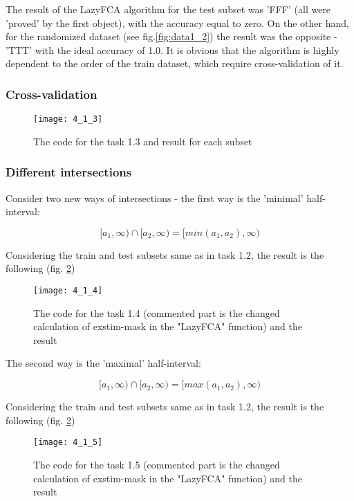 The result of the LazyFCA algorithm for the test subset was 'FFF' (all were 'proved' by the first object), with the accuracy equal to zero. 
On the other hand, for the randomized dataset (see fig.\ref{fig:data1_2}) the result was the opposite - 'TTT' with the ideal accuracy of 1.0.
It is obvious that the algorithm is highly dependent to the order of the train dataset, which require cross-validation of it.


\subsubsection{Cross-validation}

\begin{figure}[h]
\centering
\texttt{[image: 4\_1\_3]}
\caption{The code for the task 1.3 and result for each subset}
\end{figure}

\subsubsection{Different intersections}

Consider two new ways of intersections - the first way is the 'minimal' half-interval:

\[ [a_1, \infty) \cap [a_2, \infty) = [min(a_1,a_2), \infty) \]

Considering the train and test subsets same as in task 1.2, the result is the following (fig. \ref{fig:min_int})

\begin{figure}[h]
\centering
\label{fig:min_int}
\texttt{[image: 4\_1\_4]}
\caption{The code for the task 1.4 (commented part is the changed calculation of exstim-mask in the "LazyFCA" function) and the result}
\end{figure}

The second way is the 'maximal' half-interval:

\[ [a_1, \infty) \cap [a_2, \infty) = [max(a_1,a_2), \infty) \]

Considering the train and test subsets same as in task 1.2, the result is the following (fig. \ref{fig:min_int})

\begin{figure}[h]
\centering
\label{fig:min_int}
\texttt{[image: 4\_1\_5]}
\caption{The code for the task 1.5 (commented part is the changed calculation of exstim-mask in the "LazyFCA" function) and the result}
\end{figure}


